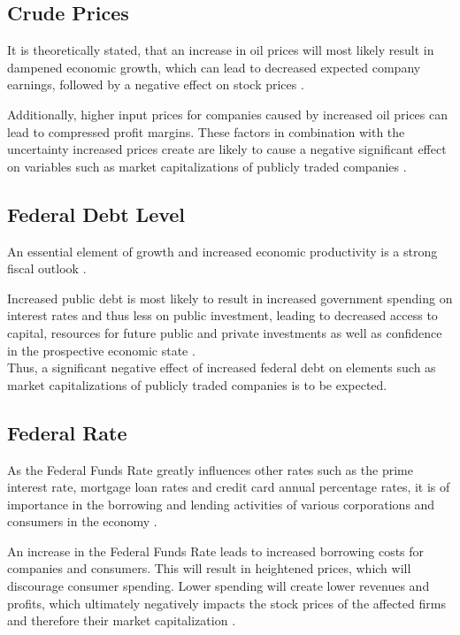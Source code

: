 \documentclass[a4paper,12pt]{article}
\begin{document}
\subsection{Crude Prices}

It is theoretically stated, that an increase in oil prices will most likely result in dampened economic growth, which can lead to decreased expected company earnings, followed by a negative effect on stock prices \citep{ECB2004}.

\noindent Additionally, higher input prices for companies caused by increased oil prices can lead to compressed profit margins. 
These factors in combination with the uncertainty increased prices create are likely to cause a negative significant effect on variables such as market capitalizations of publicly traded companies \citep{ECB2004}.

\subsection{Federal Debt Level}

An essential element of growth and increased economic productivity is a strong fiscal outlook \citep{PGPF2022}.

\noindent Increased public debt is most likely to result in increased government spending on interest rates and thus less on public investment, leading to decreased access to capital, resources for future public and private investments as well as confidence in the prospective economic state \citep{PGPF2022}.\\
Thus, a significant negative effect of increased federal debt on elements such as market capitalizations of publicly traded companies is to be expected.

\subsection{Federal Rate}

As the Federal Funds Rate greatly influences other rates such as the prime interest rate, mortgage loan rates and credit card annual percentage rates, it is of importance in the borrowing and lending activities of various corporations and consumers in the economy \citep{Hall2022}.

\noindent An increase in the Federal Funds Rate leads to increased borrowing costs for companies and consumers. This will result in heightened prices, which will discourage consumer spending. Lower spending will create lower revenues and profits, which ultimately negatively impacts the stock prices of the affected firms and therefore their market capitalization \citep{Hall2022}.
\end{document}
